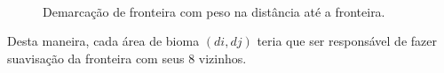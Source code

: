 \begin{figure}[H]
     \centering
     \hspace{0.1cm}
     \\
     \caption{Demarcação de fronteira com peso na distância até a fronteira.}
     
     \label{fig:borderlenanotherauxyeahp}
\end{figure}

Desta maneira, cada área de bioma $(di, dj)$ teria que ser responsável de fazer suavisação da 
fronteira com seus $8$ vizinhos.